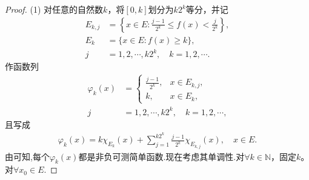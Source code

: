 \documentclass[../../main.tex]{subfiles}%
\begin{document}
\begin{proof}

(1) 对任意的自然数$k$，将$[0, k]$划分为$k2^k$等分，并记
\begin{align*}
E_{k, j} &= \left\{x \in E: \frac{j - 1}{2^k} \leqslant f(x) < \frac{j}{2^k} \right\}, \\
E_{k} &= \{x \in E: f(x) \geqslant k\}, \\
j &= 1, 2, \cdots, k2^k, \quad k = 1, 2, \cdots.
\end{align*}
作函数列
\begin{align*}
\varphi_k(x) &= 
\begin{cases}
\frac{j - 1}{2^k}, & x \in E_{k, j}, \\
k, & x \in E_{k},
\end{cases} \\
j &= 1, 2, \cdots, k2^k, \quad k = 1, 2, \cdots,
\end{align*}
且写成
\begin{align*}
\varphi_k(x) = k\chi_{E_{k}}(x) + \sum_{j = 1}^{k2^k} \frac{j - 1}{2^k} \chi_{E_{k, j}}(x), \quad x \in E.
\end{align*}
由可知,每个$\varphi_k(x)$都是非负可测简单函数.现在考虑其单调性.对$\forall k\in \mathbb{N}$，固定$k$。对$\forall x_0\in E$.


\end{proof}
\end{document}
